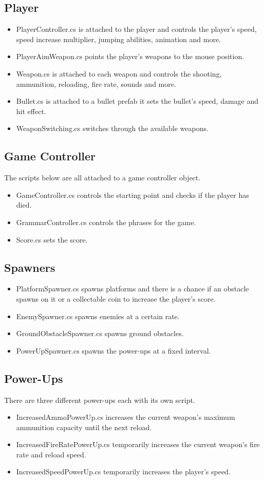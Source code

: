 \documentclass{article}
\begin{document}
\subsection{Player}
\begin{itemize}
	\item PlayerController.cs is attached to the player and controls the player's speed, speed increase multiplier, jumping abilities, animation and more.
	\item PlayerAimWeapon.cs points the player's weapons to the mouse position.
	\item Weapon.cs is attached to each weapon and controls the shooting, ammunition, reloading, fire rate, sounds and more.
	\item Bullet.cs is attached to a bullet prefab it sets the bullet's speed, damage and hit effect.
	\item WeaponSwitching.cs switches through the available weapons.
\end{itemize}

\subsection{Game Controller}
The scripts below are all attached to a game controller object.
\begin{itemize}
	\item GameController.cs controls the starting point and checks if the player has died.
	\item GrammarController.cs controls the phrases for the game.
	\item Score.cs sets the score.
\end{itemize}

\subsection{Spawners}
\begin{itemize}
	\item PlatformSpawner.cs spawns platforms and there is a chance if an obstacle spawns on it or a collectable coin to increase the player's score.
	\item EnemySpawner.cs spawns enemies at a certain rate.
	\item GroundObstacleSpawner.cs spawns ground obstacles.
	\item PowerUpSpawner.cs spawns the power-ups at a fixed interval.
\end{itemize}

\subsection{Power-Ups}
There are three different power-ups each with its own script.
\begin{itemize}
	\item IncreasedAmmoPowerUp.cs increases the current weapon's maximum ammunition capacity until the next reload.
	\item IncreasedFireRatePowerUp.cs temporarily increases the current weapon's fire rate and reload speed.
	\item IncreasedSpeedPowerUp.cs temporarily increases the player's speed.
\end{itemize}
\end{document}
